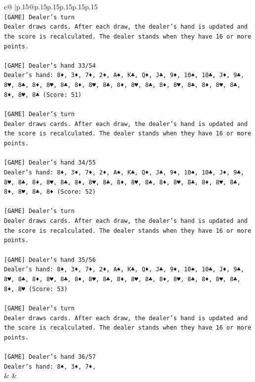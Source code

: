 \documentclass{article}
\begin{document}
{\begin{supertabular}{c@{$\;$}|p{.15\linewidth}@{}p{.15\linewidth}p{.15\linewidth}p{.15\linewidth}p{.15\linewidth}p{.15\linewidth}}
{{{\\ 
\texttt{{[}GAME{]} Dealer's turn} \\
\texttt{Dealer draws cards. After each draw, the dealer's hand is updated and the score is recalculated. The dealer stands when they have 16 or more points.} \\
\\ 
\texttt{{[}GAME{]} Dealer's hand 33/54} \\
\texttt{Dealer's hand: 8♦, 3♦, 7♦, 2♦, A♠, K♣, Q♦, J♣, 9♦, 10♠, 10♣, J♦, 9♣, 8♥, 8♣, 8♦, 8♥, 8♣, 8♦, 8♥, 8♣, 8♦, 8♥, 8♣, 8♦, 8♥, 8♣, 8♦, 8♥, 8♣, 8♦, 8♥, 8♣ (Score: 51)} \\
\\ 
\texttt{{[}GAME{]} Dealer's turn} \\
\texttt{Dealer draws cards. After each draw, the dealer's hand is updated and the score is recalculated. The dealer stands when they have 16 or more points.} \\
\\ 
\texttt{{[}GAME{]} Dealer's hand 34/55} \\
\texttt{Dealer's hand: 8♦, 3♦, 7♦, 2♦, A♠, K♣, Q♦, J♣, 9♦, 10♠, 10♣, J♦, 9♣, 8♥, 8♣, 8♦, 8♥, 8♣, 8♦, 8♥, 8♣, 8♦, 8♥, 8♣, 8♦, 8♥, 8♣, 8♦, 8♥, 8♣, 8♦, 8♥, 8♣, 8♦ (Score: 52)} \\
\\ 
\texttt{{[}GAME{]} Dealer's turn} \\
\texttt{Dealer draws cards. After each draw, the dealer's hand is updated and the score is recalculated. The dealer stands when they have 16 or more points.} \\
\\ 
\texttt{{[}GAME{]} Dealer's hand 35/56} \\
\texttt{Dealer's hand: 8♦, 3♦, 7♦, 2♦, A♠, K♣, Q♦, J♣, 9♦, 10♠, 10♣, J♦, 9♣, 8♥, 8♣, 8♦, 8♥, 8♣, 8♦, 8♥, 8♣, 8♦, 8♥, 8♣, 8♦, 8♥, 8♣, 8♦, 8♥, 8♣, 8♦, 8♥ (Score: 53)} \\
\\ 
\texttt{{[}GAME{]} Dealer's turn} \\
\texttt{Dealer draws cards. After each draw, the dealer's hand is updated and the score is recalculated. The dealer stands when they have 16 or more points.} \\
\\ 
\texttt{{[}GAME{]} Dealer's hand 36/57} \\
\texttt{Dealer's hand: 8♦, 3♦, 7♦,} \\
            }
        }
    }
    & & \\ \\


\end{supertabular}}
\end{document}
